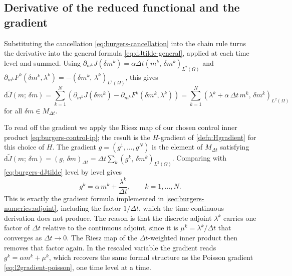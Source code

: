 \documentclass[a4paper,11pt]{article}
\newcommand{\Om}{\Omega}
\newcommand{\Lp}[1]{L^{2}(#1)}              %
\newcommand{\inner}[3]{(#1,\,#2)_{#3}}        %
\newcommand{\Jt}{\tilde{J}}                  %
\newcommand{\Mspace}{M}
\theoremstyle{spacedplain} \newtheorem{theorem}[counter]{Theorem} \newtheorem{lemma}[counter]{Lemma} \newtheorem{prop}[counter]{Proposition} \newtheorem{cor}[counter]{Corollary}
\theoremstyle{spaceddefinition} \newtheorem{defn}[counter]{Definition} \newtheorem{example}[counter]{Example} \newtheorem{remark}[counter]{Remark}
\begin{document}
\subsection{Derivative of the reduced functional and the gradient}
\label{sec:burgers-deriv:reduced}

Substituting the cancellation \cref{eq:burgers-cancellation} into the chain rule turns the derivative into the general formula \cref{eq:dJtilde-general}, applied at each time level and summed. Using $\partial_{m^k} J(\delta m^k) = \alpha \Delta t \inner{m^k}{\delta m^k}{\Lp{\Om}}$ and $\partial_{m^k} F^{k}(\delta m^k, \lambda^k) = -\inner{\delta m^k}{\lambda^k}{\Lp{\Om}}$, this gives
\begin{equation}
  \label{eq:burgers-dJtilde}
  \mathrm{d}\Jt(m;\, \delta m)
  = \sum_{k=1}^{N}
    \left(
      \partial_{m^k} J(\delta m^k)
      - \partial_{m^k} F^{k}(\delta m^k, \lambda^k)
    \right)
  = \sum_{k=1}^{N}
    \inner{\lambda^k + \alpha\, \Delta t\, m^k}{\delta m^k}{\Lp{\Om}}
\end{equation}
for all $\delta m \in \Mspace_{\Delta t}$.

To read off the gradient we apply the Riesz map of our chosen control inner product \cref{eq:burgers-control-ip}; the result is the $H$-gradient of \cref{defn:Hgradient} for this choice of $H$. The gradient $g = (g^1, \ldots, g^N)$ is the element of $\Mspace_{\Delta t}$ satisfying $\mathrm{d}\Jt(m;\, \delta m) = \inner{g}{\delta m}{\Delta t} = \Delta t \sum_k \inner{g^k}{\delta m^k}{\Lp{\Om}}$. Comparing with \cref{eq:burgers-dJtilde} level by level gives
\begin{equation}
  \label{eq:burgers-gradient}
  g^k = \alpha\, m^k + \frac{\lambda^k}{\Delta t},
  \qquad k = 1, \ldots, N.
\end{equation}
This is exactly the gradient formula implemented in \cref{sec:burgers-numerics:adjoint}, including the factor $1 / \Delta t$, which the time-continuous derivation does not produce. The reason is that the discrete adjoint $\lambda^k$ carries one factor of $\Delta t$ relative to the continuous adjoint, since it is $\mu^k = \lambda^k / \Delta t$ that converges as $\Delta t \to 0$. The Riesz map of the $\Delta t$-weighted inner product then removes that factor again. In the rescaled variable the gradient reads $g^k = \alpha m^k + \mu^k$, which recovers the same formal structure as the Poisson gradient \cref{eq:l2gradient-poisson}, one time level at a time.

\end{document}
